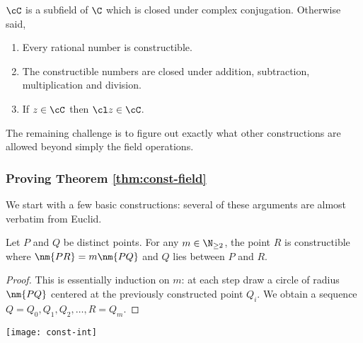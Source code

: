 \begin{thm}\label{thm:const-field}
$\cC$ is a subfield of $\C$ which is closed under complex conjugation. Otherwise said,
\begin{enumerate}
  \item Every rational number is constructible.
  \item The constructible numbers are closed under addition, subtraction, multiplication and division.
  \item If $z\in\cC$ then $\cl z\in\cC$.
\end{enumerate}
\end{thm}

The remaining challenge is to figure out exactly what other constructions are allowed beyond simply the field operations.%


\subsubsection*{Proving Theorem \ref{thm:const-field}}

We start with a few basic constructions: several of these arguments are almost verbatim from Euclid.

\begin{prop}\label{prop:const-int}
Let $P$ and $Q$ be distinct points. For any $m\in\N_{\ge 2}$, the point $R$ is constructible where $\nm{PR}=m\nm{PQ}$ and $Q$ lies between $P$ and $R$.
\end{prop}

\begin{proof}
This is essentially induction on $m$: at each step draw a circle of radius $\nm{PQ}$ centered at the previously constructed point $Q_i$. We obtain a sequence $Q=Q_0,Q_1,Q_2,\ldots, R=Q_m$.
\end{proof}
\begin{center}
\texttt{[image: const-int]}
\end{center}


